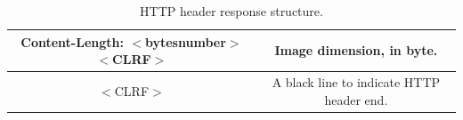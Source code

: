 \begin{table}[!h]
\begin{tabular}{| c | c |}
    \hline
    \parbox[t]{6.5cm}{\raggedright \small Content-Length: $<$bytesnumber$>$ $<$CLRF$>$} &
    \parbox[t]{6cm}{\raggedright \small
      Image dimension, in byte.} \\  [1ex]

    \hline
    \parbox[t]{6.5cm}{\raggedright \small $<$CLRF$>$} &
    \parbox[t]{6cm}{\raggedright \small
      A black line to indicate HTTP header end.} \\ [1ex]

    \hline


  \end{tabular}
  \caption{HTTP header response structure.}
  \label{table:header_response}
\end{table}
